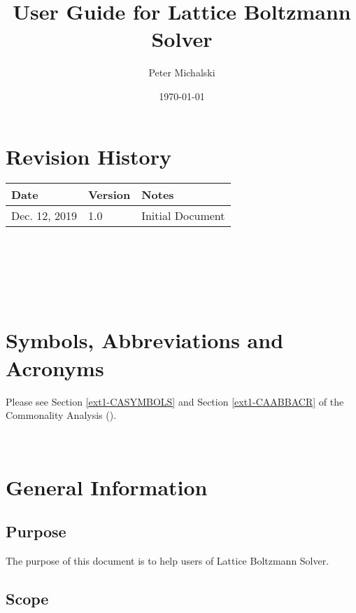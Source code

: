 \documentclass[12pt, titlepage]{article}
\newcommand{\myprogname}{Lattice Boltzmann Solver}
\begin{document}
\title{User Guide for \myprogname} 
\author{Peter Michalski}
\date{\today}
	
\maketitle


\section{Revision History}

\begin{tabularx}{\textwidth}{p{4cm}p{2cm}X}
\toprule {\bf Date} & {\bf Version} & {\bf Notes}\\
\midrule
Dec. 12, 2019 & 1.0 & Initial Document\\
\bottomrule
\end{tabularx}

~\newpage

\tableofcontents

~\newpage

\listoftables

~\newpage

\section{Symbols, Abbreviations and Acronyms}

Please see Section \ref{ext1-CASYMBOLS} and Section \ref{ext1-CAABBACR} of the Commonality Analysis (\citet{LBM_CA_PM}).

~\newpage


\section{General Information}
\label{generalinfo}

\subsection{Purpose}
\label{purpose}

\noindent The purpose of this document is to help users of {\myprogname}.

\subsection{Scope}
\end{document}
